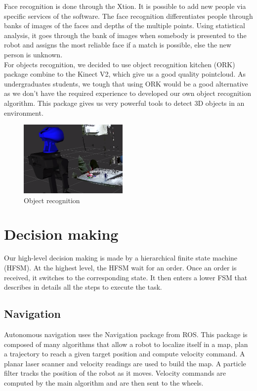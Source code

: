 \documentclass[runningheads,a4paper]{llncs}
\begin{document}
Face recognition is done through the Xtion. It is possible to add new people via specific services of the software. The face recognition differentiates people through banks of images of the faces and depths of the multiple points. Using statistical analysis, it goes through the bank of images when somebody is presented to the robot and assigns the most reliable face if a match is
possible, else the new person is unknown. \\

For objects recognition, we decided to use object recognition kitchen (ORK) \cite{ork} package combine  to the Kinect V2, which give us a good quality pointcloud. As undergraduates students, we tough that using ORK would be a good alternative as we don't have the required experience to developed our own object recognition algorithm. This package gives us very powerful tools to detect 3D objects in an environment. \\

\begin{figure}
  \centering
  \includegraphics[width=150pt]{images/objectreco.png}
  \caption{Object recognition}
\end{figure}

\newpage
\section{Decision making}
\tab Our high-level decision making is made by a hierarchical finite state machine (HFSM). At the highest level, the HFSM wait for an order. Once an order is received, it switches to the corresponding state. It then enters a lower FSM that describes in details all the steps to execute the task. 

\subsection{Navigation}
\tab Autonomous navigation uses the Navigation package from ROS. This package is composed of many algorithms that allow a robot to localize itself in a map, plan a trajectory to reach a given target position and compute velocity command. A planar laser scanner and velocity readings are used to build the map. A particle filter tracks the position of the robot as it moves. Velocity commands are computed by the main algorithm and are then sent to the wheels. 
\end{document}
